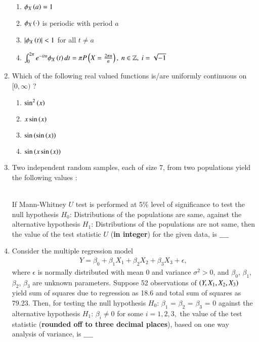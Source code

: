 \documentclass[journal]{IEEEtran}
\begin{document}
\begin{enumerate}
\begin{enumerate}
    \item $\phi_X\left(a\right) = 1$
    \item $\phi_X\left(\cdot\right)$ is periodic with period $a$
    \item $\left\vert\phi_X\left(t\right)\right\vert < 1$ for all $t \neq a$
    \item $\int_{0}^{2\pi} e^{-itn}\phi_X\left(t\right)dt = \pi P \left(X = \frac{2 \pi n}{a}\right),\ n\in \mathbb{Z},\ i = \sqrt{-1}$ \\
\end{enumerate}
\item Which of the following real valued functions is/are uniformly continuous on $[0, \infty)$ ?
\begin{enumerate}
    \item $\sin^2\left(x\right)$
    \item $x\sin\left(x\right)$
    \item $\sin\left(\sin\left(x\right)\right)$
    \item $\sin\left(x\sin\left(x\right)\right)$ \\ 
\end{enumerate}
\item Two independent random samples, each of size 7, from two populations yield the following values : 
\begin{table}[h!]
  \centering
  
\end{table}\\
If Mann-Whitney $U$ test is performed at 5\% level of significance to test the null hypothesis $H_0$: Distributions of the populations are same, against the alternative hypothesis $H_1$: Distributions of the populations are not same, then the value of the test statistic $U$ (\textbf{in integer}) for the given data, is $\_\_\_\_$ \\
\item Consider the multiple regression model
\begin{align*}
    Y = \beta_0 + \beta_1X_1 + \beta_2X_2 +\beta_3X_3 + \epsilon,
\end{align*}
where $\epsilon$ is normally distributed with mean 0 and variance $\sigma^2 > 0$, and $\beta_0$, $\beta_1$, $\beta_2$, $\beta_3$ are unknown parameters. Suppose 52 observations of $\left(Y, X_1, X_2, X_3\right)$ yield sum of squares due to regression as 18.6 and total sum of squares as 79.23. Then, for testing the null hypothesis $H_0$: $\beta_1$ = $\beta_2$ = $\beta_3$ = 0 against the alternative hypothesis $H_1$: $\beta_i \neq 0$ for some $i = 1, 2, 3,$ the value of the test statistic (\textbf{rounded off to three decimal places}), based on one way analysis of variance, is $\_\_\_\_$
			 \end{enumerate}
			 
\end{document}
